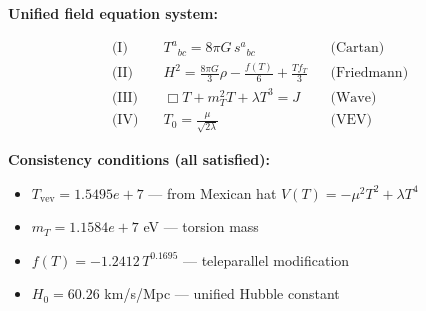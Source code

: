 
\textbf{Unified field equation system:}

\begin{align}
  \text{(I)} \quad & T^a{}_{bc} = 8\pi G \, s^a{}_{bc} && \text{(Cartan)} \\
  \text{(II)} \quad & H^2 = \frac{8\pi G}{3}\rho - \frac{f(T)}{6} + \frac{Tf_T}{3} && \text{(Friedmann)} \\
  \text{(III)} \quad & \Box T + m_T^2 T + \lambda T^3 = J && \text{(Wave)} \\
  \text{(IV)} \quad & T_0 = \frac{\mu}{\sqrt{2\lambda}} && \text{(VEV)}
\end{align}

\textbf{Consistency conditions (all satisfied):}
\begin{itemize}
  \item $T_{\text{vev}} = 1.5495e+7$ — from Mexican hat $V(T) = -\mu^2 T^2 + \lambda T^4$
  \item $m_T = 1.1584e+7$ eV — torsion mass
  \item $f(T) = -1.2412 \, T^{0.1695}$ — teleparallel modification
  \item $H_0 = 60.26$ km/s/Mpc — unified Hubble constant
\end{itemize}